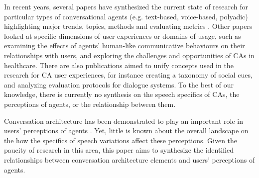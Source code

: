 In recent years, several papers have synthesized the current state of research for particular types of conversational agents (e.g. text-based, voice-based, polyadic) highlighting major trends, topics, methods and evaluating metrics \cite{clark2019state, rapp2021human, zheng2022ux}\cmt{[33][5]}. Other papers looked at specific dimensions of user experiences or domains of usage, such as \citet{van2020human} examining the effects of agents' human-like communicative behaviours on their relationships with users, and \citet{kocaballi2022design} exploring the challenges and opportunities of CAs in healthcare. There are also publications aimed to unify concepts used in the research for CA user experiences, for instance \citet{feine2019taxonomy} creating a taxonomy of social cues, and \citet{finch2020towards} analyzing evaluation protocols for dialogue systems. To the best of our knowledge, there is currently no synthesis on the speech specifics of CAs, the perceptions of agents, or the relationship between them.

Conversation architecture has been demonstrated to play an important role in users' perceptions of agents \cite{knijnenburg2016inferring, moussawi2021perceptions, seeger2021chatbots}\cmt{[35]}. Yet, little is known about the overall landscape on the how the specifics of speech variations affect these perceptions. Given the paucity of research in this area, this paper aims to synthesize the identified relationships between conversation architecture elements and users' perceptions of agents.